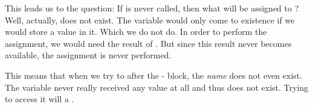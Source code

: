 This leads us to the question:
If  is never called, then what will be assigned to ?
Well, actually,  does not exist.
The variable  would only come to existence if we would store a value in it.
Which we do not do.
In order to perform the assignment, we would need the result of .
But since this result never becomes available, the assignment is never performed.

This means that when we try to  after the - block, the \emph{name}  does not even exist.
The variable  never really received any value at all and thus does not exist.
Trying to access it will  a .

